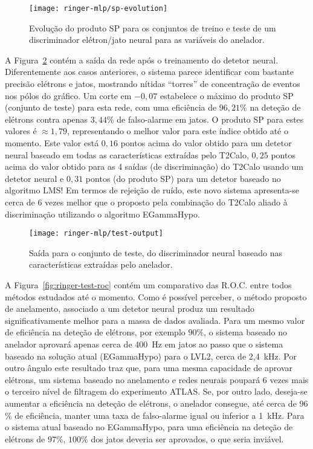 \begin{figure}
\begin{center}
\texttt{[image: ringer-mlp/sp-evolution]}
\end{center}
\caption{Evolução do produto SP para os conjuntos de treino e teste de um
discriminador elétron/jato neural para as variáveis do anelador.}
\label{fig:ringer-mlp-sp}
\end{figure}

A Figura~\ref{fig:ringer-mlp-output} contém a saída da rede após o treinamento
do detetor neural. Diferentemente aos casos anteriores, o sistema parece
identificar com bastante precisão elétrons e jatos, mostrando nítidas
``torres'' de concentração de eventos nos pólos do gráfico. Um corte em
$-0,07$ estabelece o máximo do produto SP (conjunto de teste) para esta rede,
com uma eficiência de $96,21$\% na deteção de elétrons contra apenas $3,44$\%
de falso-alarme em jatos. O produto SP para estes valores é $\approx 1,79$,
representando o melhor valor para este índice obtido até o momento. Este valor
está $0,16$ pontos acima do valor obtido para um detetor neural baseado em
todas as características extraídas pelo T2Calo, $0,25$ pontos acima do valor
obtido para as 4 saídas (de discriminação) do T2Calo usando um detetor neural
e $0,31$ pontos (do produto SP) para um detetor baseado no algoritmo LMS! Em
termos de rejeição de ruído, este novo sistema apresenta-se cerca de 6 vezes
melhor que o proposto pela combinação do T2Calo aliado à discriminação
utilizando o algoritmo EGammaHypo.

\begin{figure}
\begin{center}
\texttt{[image: ringer-mlp/test-output]}
\end{center}
\caption{Saída para o conjunto de teste, do discriminador neural baseado nas
características extraídas pelo anelador.}
\label{fig:ringer-mlp-output}
\end{figure}

A Figura~\ref{fig:ringer-test-roc} contém um comparativo das R.O.C. entre
todos métodos estudados até o momento. Como é possível perceber, o método
proposto de anelamento, associado a um detetor neural produz um resultado
significativamente melhor para a massa de dados avaliada. Para um mesmo valor
de eficiência na deteção de elétrons, por exemplo $90$\%, o sistema baseado no
anelador aprovará apenas cerca de 400~Hz em jatos ao passo que o sistema
baseado na solução atual (EGammaHypo) para o LVL2, cerca de 2,4~kHz. Por outro
ângulo este resultado traz que, para uma mesma capacidade de aprovar elétrons,
um sistema baseado no anelamento e redes neurais poupará 6 vezes mais o
terceiro nível de filtragem do experimento ATLAS. Se, por outro lado, deseja-se
aumentar a eficiência na deteção de elétrons, o anelador consegue, até cerca
de $96$\% de eficiência, manter uma taxa de falso-alarme igual ou inferior a
1~kHz. Para o sistema atual baseado no EGammaHypo, para uma eficiência na
deteção de elétrons de $97$\%, $100$\% dos jatos deveria ser aprovados, o que
seria inviável.

